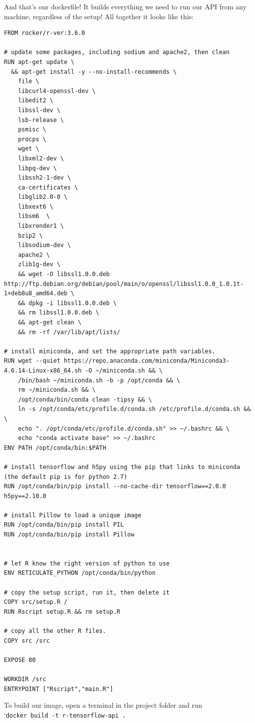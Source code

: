 \documentclass[]{book}
\begin{document}
And that's our dockerfile! It builds everything we need to run our API from any machine, regardless of the setup! All together it looks like this:

\begin{verbatim}
FROM rocker/r-ver:3.6.0

# update some packages, including sodium and apache2, then clean
RUN apt-get update \
  && apt-get install -y --no-install-recommends \
    file \
    libcurl4-openssl-dev \
    libedit2 \
    libssl-dev \
    lsb-release \
    psmisc \
    procps \
    wget \
    libxml2-dev \
    libpq-dev \
    libssh2-1-dev \
    ca-certificates \
    libglib2.0-0 \
    libxext6 \
    libsm6  \
    libxrender1 \
    bzip2 \
    libsodium-dev \
    apache2 \
    zlib1g-dev \
    && wget -O libssl1.0.0.deb http://ftp.debian.org/debian/pool/main/o/openssl/libssl1.0.0_1.0.1t-1+deb8u8_amd64.deb \
    && dpkg -i libssl1.0.0.deb \
    && rm libssl1.0.0.deb \
    && apt-get clean \
    && rm -rf /var/lib/apt/lists/

# install miniconda, and set the appropriate path variables.
RUN wget --quiet https://repo.anaconda.com/miniconda/Miniconda3-4.6.14-Linux-x86_64.sh -O ~/miniconda.sh && \
    /bin/bash ~/miniconda.sh -b -p /opt/conda && \
    rm ~/miniconda.sh && \
    /opt/conda/bin/conda clean -tipsy && \
    ln -s /opt/conda/etc/profile.d/conda.sh /etc/profile.d/conda.sh && \
    echo ". /opt/conda/etc/profile.d/conda.sh" >> ~/.bashrc && \
    echo "conda activate base" >> ~/.bashrc
ENV PATH /opt/conda/bin:$PATH

# install tensorflow and h5py using the pip that links to miniconda (the default pip is for python 2.7)
RUN /opt/conda/bin/pip install --no-cache-dir tensorflow==2.0.0 h5py==2.10.0

# install Pillow to load a unique image
RUN /opt/conda/bin/pip install PIL
RUN /opt/conda/bin/pip install Pillow


# let R know the right version of python to use
ENV RETICULATE_PYTHON /opt/conda/bin/python

# copy the setup script, run it, then delete it
COPY src/setup.R /
RUN Rscript setup.R && rm setup.R

# copy all the other R files.
COPY src /src

EXPOSE 80

WORKDIR /src
ENTRYPOINT ["Rscript","main.R"]
\end{verbatim}

To build our image, open a terminal in the project folder and run
`\texttt{docker\ build\ -t\ r-tensorflow-api\ .}
\end{document}
